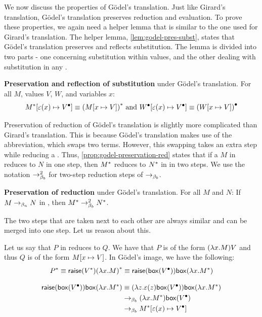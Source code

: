 We now discuss the properties of Gödel's translation.
Just like Girard's translation, Gödel's translation preserves reduction and evaluation.
To prove these properties, we again need a helper lemma that is similar to the one used for Girard's translation.
The helper lemma, \cref{lem:godel-pres-subst}, states that Gödel's translation preserves and reflects substitution.
The lemma is divided into two parts - one concerning substitution within values, and the other dealing with substitution in any \lterm.

\begin{lemma}
  \label{lem:godel-pres-subst}
  \textbf{Preservation and reflection of substitution} under Gödel's translation.
 For all \lterms $M$, values $V$, $W$, and variables $x$:
  \[
 {M}^*[{\varepsilon(x)}\mapsto{{V}^\bullet}] \equiv {(M  [{x}\mapsto{V}] )}^* \mbox{ and } {W}^\bullet[{\varepsilon(x)}\mapsto{{V}^\bullet}] \equiv {(W  [{x}\mapsto{V}] )}^\bullet
  \]
\end{lemma}

Preservation of reduction of Gödel's translation is slightly more complicated than Girard's translation.
This is because Gödel's translation makes use of the \raiseembn abbreviation, which swaps two terms.
However, this swapping takes an extra step while reducing a \lterm.
Thus, \cref{prop:godel-preservation-red} states that if a \lterm $M$ in \lav reduces to $N$ in one step, then ${M}^*$ reduces to ${N}^*$ in \lab in two steps.
We use the notation $\to_{\beta_b}^2$ for two-step reduction steps of $\to_{\beta_b}$.

\begin{proposition}
  \label{prop:godel-preservation-red}
  \textbf{Preservation of reduction} under Gödel's translation.
 For all \lterms $M$ and $N$:
  \center 
 If $M \to_{\beta_n} N$ in \lav, then ${M}^* \to_{\beta_b}^2 {N}^*$.
\end{proposition}

The two steps that are taken next to each other are always similar and can be merged into one step.
Let us reason about this. 

Let us say that \lterm $P$ in \lav reduces to \lterm $Q$. We have that $P$ is of the form $(\lambda {x}.{M}) V$ and thus $Q$ is of the form $M [{x}\mapsto{V}]$.
In Gödel's image, we have the following:
\[
{P}^* \equiv \textsf{raise}({{V}^*}) {(\lambda {x}.{M})}^* \equiv \textsf{raise}({\mathsf{box}({{V}^\bullet})}) \mathsf{box}({\lambda {x}.{{M}^*}})
\]

\begin{align*}
 \textsf{raise}({\mathsf{box}({{V}^\bullet})}) \mathsf{box}({\lambda {x}.{{M}^*}}) 
                  &\equiv (\lambda {z}.{\varepsilon(z)\mathsf{box}({{V}^\bullet})}) \mathsf{box}({\lambda {x}.{{M}^*}})   \\
                  &\to_{\beta_b} (\lambda {x}.{{M}^*})\mathsf{box}({{V}^\bullet})  \\
                  &\to_{\beta_b} {M}^* [{\varepsilon(x)}\mapsto{{V}^\bullet}] \\
\end{align*}

